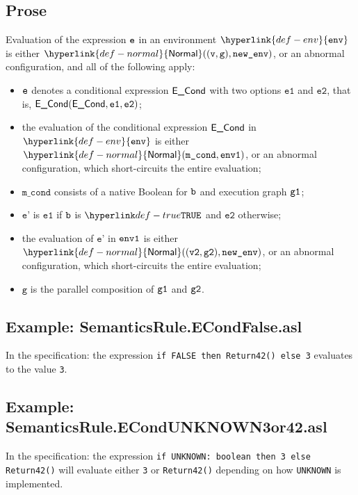 \documentclass{book}
\newcommand\ProseOrAbnormal[0]{or an abnormal configuration, which short-circuits the entire evaluation}
\newcommand\Normal[0]{\hyperlink{def-normal}{\textsf{Normal}}}
\newcommand\env[0]{\hyperlink{def-env}{\texttt{env}}}
\newcommand\vg[0]{\texttt{g}}
\newcommand\vep[0]{\texttt{e'}}
\newcommand\vvtwo[0]{\texttt{v2}}
\newcommand\veone[0]{\texttt{e1}}
\newcommand\vetwo[0]{\texttt{e2}}
\newcommand\mcond[0]{\texttt{m\_cond}}
\newcommand\econd[0]{\ECond}
\begin{document}
  \subsection{Prose}
  Evaluation of the expression $\texttt{e}$ in an environment $\env$ is either $\Normal((\vv, \vg), \newenv)$,
  or an abnormal configuration, and all of the following apply:
  \begin{itemize}
    \item $\texttt{e}$ denotes a conditional expression $\econd$ with two options $\veone$ and $\vetwo$,
    that is, $\ECond(\econd, \veone, \vetwo)$;
    \item the evaluation of the conditional expression $\econd$ in $\env$ is either \\
    $\Normal(\mcond, \envone)$, \ProseOrAbnormal;
    \item $\mcond$ consists of a native Boolean for $\texttt{b}$ and execution graph $\texttt{g1}$;
    \item $\vep$ is $\veone$ if $\texttt{b}$ is $\True$ and $\vetwo$ otherwise;
    \item the evaluation of $\vep$ in $\texttt{env1}$ is either $\Normal((\vvtwo, \vgtwo), \newenv)$,
      \ProseOrAbnormal;
    \item $\vg$ is the parallel composition of $\texttt{g1}$ and $\texttt{g2}$.
  \end{itemize}

  \subsection{Example: SemanticsRule.ECondFalse.asl}
    In the specification:
    the expression \texttt{if FALSE then Return42() else 3} evaluates to the value \texttt{3}.

  \subsection{Example: \\ SemanticsRule.ECondUNKNOWN3or42.asl}
    In the specification:
the expression \texttt{if UNKNOWN: boolean then 3 else Return42()} will
evaluate either \texttt{3} or \texttt{Return42()} depending on how
\texttt{UNKNOWN} is implemented.


\end{document}
